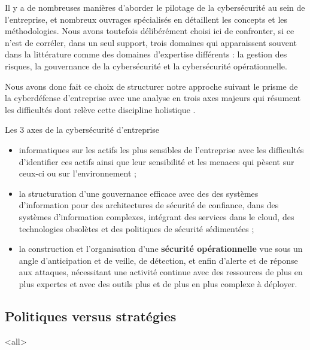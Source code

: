 Il y a de nombreuses manières d’aborder le pilotage de la cybersécurité au sein de l’entreprise, et nombreux ouvrages spécialisés en détaillent les concepts et les méthodologies. Nous avons toutefois délibérément choisi ici de confronter, si ce n'est de corréler, dans un seul support, trois domaines qui apparaissent souvent dans la littérature comme des domaines d'expertise différents : la gestion des risques, la gouvernance de la cybersécurité et la cybersécurité opérationnelle. 

Nous avons donc fait ce choix de structurer notre approche suivant le prisme de la cyberdéfense d'entreprise avec une analyse en trois axes majeurs qui résument les difficultés dont relève cette discipline holistique . 


\begin{frame}{Les 3 axes de la cybersécurité d'entreprise}
	\begin{itemize}
 \item {} informatiques sur les actifs les plus sensibles de l'entreprise avec les difficultés d'identifier ces actifs ainsi que leur sensibilité et les menaces qui pèsent sur ceux-ci ou sur l'environnement ;
\item la structuration d'une gouvernance efficace avec des  des systèmes d'information pour des architectures de sécurité de confiance, dans des systèmes d'information complexes, intégrant des services dans le cloud, des technologies obsolètes et des politiques de sécurité sédimentées ;
\item la construction et l’organisation d'une \textbf{sécurité opérationnelle} vue sous un angle d'anticipation et de veille, de détection, et enfin d'alerte et de réponse aux attaques, nécessitant une activité continue avec des ressources de plus en plus expertes et avec des outils plus  et de plus en plus complexe à déployer.
\end{itemize}
\end{frame}

\subsection {Politiques versus stratégies}


\mode<all>{}


